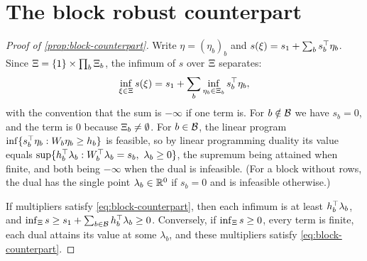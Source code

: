 \section{The block robust counterpart}
\label{app:primal}

\begin{proof}[Proof of \cref{prop:block-counterpart}]
Write $\eta = (\eta_b)_b$ and $s(\xi) = s_1 + \sum_b s_b^\top\eta_b$.
Since $\Xi = \{1\} \times \prod_b \Xi_{b}$, the infimum of $s$ over $\Xi$ separates:
\[
\inf_{\xi\in\Xi} s(\xi) = s_1 + \sum_b \inf_{\eta_b \in \Xi_{b}} s_b^\top\eta_b,
\]
with the convention that the sum is $-\infty$ if one term is.
For $b \notin \mathcal{B}$ we have $s_b = 0$, and the term is $0$ because $\Xi_{b} \neq \emptyset$.
For $b \in \mathcal{B}$, the linear program $\inf\{s_b^\top\eta_b : W_b\eta_b \ge h_b\}$ is feasible,
so by linear programming duality its value equals $\sup\{h_b^\top\lambda_b : W_b^\top\lambda_b = s_b,\ \lambda_b \ge 0\}$,
the supremum being attained when finite, and both being $-\infty$ when the dual is infeasible.
(For a block without rows, the dual has the single point $\lambda_b \in \mathbb{R}^0$ if $s_b = 0$ and is infeasible otherwise.)

If multipliers satisfy \eqref{eq:block-counterpart}, then each infimum is at least $h_b^\top\lambda_b$, and $\inf_\Xi s \ge s_1 + \sum_{b\in\mathcal{B}} h_b^\top\lambda_b \ge 0$.
Conversely, if $\inf_\Xi s \ge 0$, every term is finite, each dual attains its value at some $\lambda_b$, and these multipliers satisfy \eqref{eq:block-counterpart}.
\end{proof}

